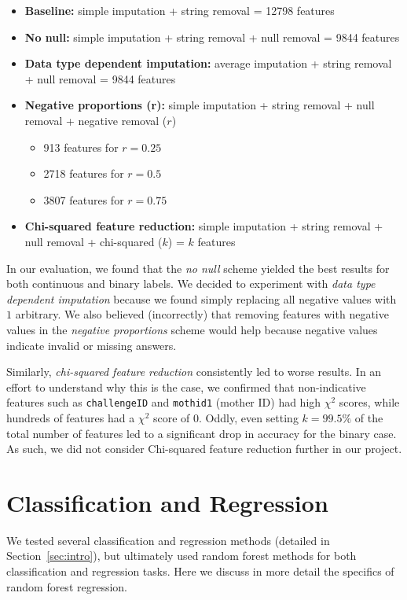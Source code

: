 \documentclass{article} %
\begin{document}
\begin{itemize}
\item \textbf{Baseline:} simple imputation + string removal = 12798 features
\item \textbf{No null:} simple imputation + string removal + null removal = 9844 features
\item \textbf{Data type dependent imputation:} average imputation + string removal + null removal = 9844 features
\item \textbf{Negative proportions (r):} simple imputation + string removal + null removal + negative removal ($r$)
  \begin{itemize}
    \item{913 features for $r = 0.25$}
    \item{2718 features for $r = 0.5$}
    \item{3807 features for $r = 0.75$}
  \end{itemize}
\item \textbf{Chi-squared feature reduction:} simple imputation + string removal + null removal + chi-squared ($k$) = $k$ features
\end{itemize}

In our evaluation, we found that the \textit{no null} scheme yielded the best results for both continuous and binary labels. We decided to experiment with \textit{data type dependent imputation} because we found simply replacing all negative values with $1$ arbitrary. We also believed (incorrectly) that removing features with negative values in the \textit{negative proportions} scheme would help because negative values indicate invalid or missing answers.

Similarly, \textit{chi-squared feature reduction} consistently led to worse results. In an effort to understand why this is the case, we confirmed that non-indicative features such as \texttt{challengeID} and \texttt{mothid1} (mother ID) had high $\chi^2$ scores, while hundreds of features had a $\chi^2$ score of 0. Oddly, even setting $k = 99.5\%$ of the total number of features led to a significant drop in accuracy for the binary case. 
As such, we did not consider Chi-squared feature reduction further in our project.

\section{Classification and Regression}
\label{sec:regression}

We tested several classification and regression methods (detailed in Section~\ref{sec:intro}), but ultimately used random forest methods for both classification and regression tasks. Here we discuss in more detail the specifics of random forest regression.
\end{document}
